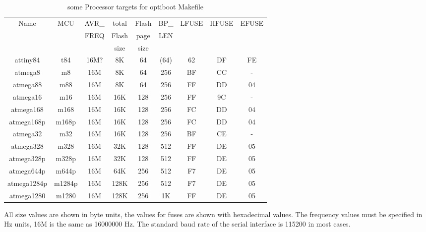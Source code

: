 \begin{table}[H]
  \begin{center}
    \begin{tabular}{| c | c | c | c | c | c | c | c | c |}
    \hline
             Name  & MCU & AVR\_ & total & Flash & BP\_ & LFUSE & HFUSE & EFUSE  \\
                   &     & FREQ  & Flash & page  & LEN  &       &       &        \\
                   &     &       &  size & size  &      &       &       &        \\
    \hline
    \hline
         attiny84 & t84   & 16M? &  8K   &  64   & (64) &  62   &  DF   & FE \\
    \hline
         atmega8  & m8    & 16M  &  8K   &  64   & 256  &  BF   &  CC   &  - \\
    \hline
         atmega88 & m88   & 16M  &  8K   &  64   & 256  &  FF   &  DD   &  04 \\
    \hline
       atmega16   & m16   & 16M  &  16K  & 128   & 256  &  FF   &  9C   &  - \\
    \hline
       atmega168  &  m168  & 16M  &  16K & 128   & 256  &  FC   &  DD   &  04 \\
       atmega168p &  m168p & 16M  &  16K & 128   & 256  &  FC   &  DD   &  04 \\
    \hline
       atmega32   &  m32   & 16M  &  16K & 128   & 256  &  BF   &  CE   &  - \\
    \hline
       atmega328  &  m328  & 16M  &  32K & 128   & 512  &  FF   &  DE   &  05 \\
       atmega328p & m328p & 16M  &  32K  & 128   & 512  &  FF   &  DE   &  05 \\
    \hline
       atmega644p & m644p & 16M  &  64K  & 256   & 512  &  F7   &  DE   &  05 \\
    \hline
     atmega1284p & m1284p & 16M  & 128K  & 256   & 512  &  F7   &  DE   &  05 \\
    \hline
     atmega1280  & m1280  & 16M  &  128K & 256   & 1K   &  FF   &  DE   &  05 \\
    \hline
    \end{tabular}
  \end{center}
  \caption{some Processor targets for optiboot Makefile}
  \label{tab:processors}
\end{table}

All size values are shown in byte units, the values for fuses are shown with hexadecimal values.
The frequency values must be specified in Hz units, 16M is the same as 16000000 Hz.
The standard baud rate of the serial interface is 115200 in most cases.

